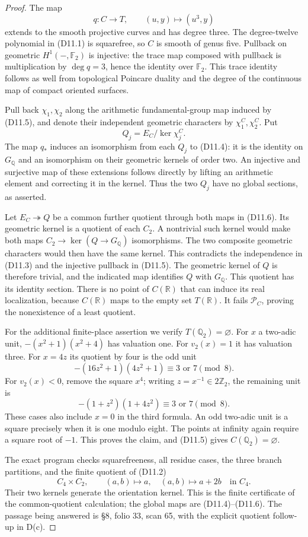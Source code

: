 \documentclass[11pt,oneside]{article}
\begin{document}
\begin{proof}
The map
\[
 q:C\longrightarrow T,\qquad (u,y)\longmapsto(u^3,y)
 \tag{D11.5}
\]
extends to the smooth projective curves and has degree
three. The degree-twelve polynomial in (D11.1) is
squarefree, so $C$ is smooth of genus five. Pullback
on geometric $H^1(-,\mathbb F_2)$ is injective: the
trace map composed with pullback is multiplication
by $\deg q=3$, hence the identity over $\mathbb F_2$.
This trace identity follows as well from topological
Poincare duality and the degree of the continuous map
of compact oriented surfaces.

Pull back $\chi_1,\chi_2$ along the arithmetic
fundamental-group map induced by (D11.5), and denote
their independent geometric characters by
$\chi_1^C,\chi_2^C$. Put
\[
 Q_j=E_C/\ker\chi_j^C .
 \tag{D11.6}
\]
The map $q_*$ induces an isomorphism from each $Q_j$
to (D11.4): it is the identity on $G_{\mathbb Q}$ and
an isomorphism on their geometric kernels of order
two. An injective and surjective map of these
extensions follows directly by lifting an arithmetic
element and correcting it in the kernel. Thus the
two $Q_j$ have no global sections, as asserted.

Let $E_C\twoheadrightarrow Q$ be a common further
quotient through both maps in (D11.6). Its geometric
kernel is a quotient of each $C_2$. A nontrivial
such kernel would make both maps $C_2\to\ker(Q\to
G_{\mathbb Q})$ isomorphisms. The two composite
geometric characters would then have the same
kernel. This contradicts the independence in
(D11.3) and the injective pullback in (D11.5).
The geometric kernel of $Q$ is therefore trivial,
and the indicated map identifies $Q$ with
$G_{\mathbb Q}$. This quotient has its identity
section. There is no point of $C(\mathbb R)$ that
can induce its real localization, because
$C(\mathbb R)$ maps to the empty set $T(\mathbb R)$.
It fails $\mathcal P_C$, proving the nonexistence
of a least quotient.

For the additional finite-place assertion we verify
$T(\mathbb Q_2)=\varnothing$. For $x$ a two-adic unit,
$-(x^2+1)(x^2+4)$ has valuation one. For
$v_2(x)=1$ it has valuation three. For
$x=4z$ its quotient by four is the odd unit
\[
 -(16z^2+1)(4z^2+1)\equiv3\text{ or }7\pmod8 .
\]
For $v_2(x)<0$, remove the square $x^4$; writing
$z=x^{-1}\in2\mathbb Z_2$, the remaining unit is
\[
 -(1+z^2)(1+4z^2)\equiv3\text{ or }7\pmod8 .
\]
These cases also include $x=0$ in the third formula.
An odd two-adic unit is a square precisely when it is
one modulo eight. The points at infinity again
require a square root of $-1$. This proves the
claim, and (D11.5) gives $C(\mathbb Q_2)=\varnothing$.

The exact program checks squarefreeness, all residue
cases, the three branch partitions, and the finite
quotient of (D11.2)
\[
 C_4\times C_2,\qquad
 (a,b)\longmapsto a,\quad (a,b)\longmapsto a+2b
 \quad\text{in }C_4.
\]
Their two kernels generate the orientation kernel.
This is the finite certificate of the common-quotient
calculation; the global maps are (D11.4)--(D11.6).
The passage being answered is \S8, folio 33, scan 65,
with the explicit quotient follow-up in D(c).
\end{proof}
\end{document}

